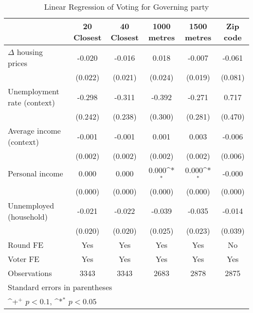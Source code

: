 \begin{table}[htbp]\centering
\def\sym#1{\ifmmode^{#1}\else\(^{#1}\)\fi}
\caption{Linear Regression of Voting for Governing party } \footnotesize \label{lrscale}
\begin{tabular}{l*{5}{c}}
\hline\hline
                    &\multicolumn{1}{c}{20 Closest}&\multicolumn{1}{c}{40 Closest}&\multicolumn{1}{c}{1000 metres}&\multicolumn{1}{c}{1500 metres}&\multicolumn{1}{c}{Zip code}\\
\hline
$\Delta$ housing prices&      -0.020       &      -0.016       &       0.018       &      -0.007       &      -0.061       \\
                    &     (0.022)       &     (0.021)       &     (0.024)       &     (0.019)       &     (0.081)       \\
[1em]
Unemployment rate (context)&      -0.298       &      -0.311       &      -0.392       &      -0.271       &       0.717       \\
                    &     (0.242)       &     (0.238)       &     (0.300)       &     (0.281)       &     (0.470)       \\
[1em]
Average income (context)&      -0.001       &      -0.001       &       0.001       &       0.003       &      -0.006       \\
                    &     (0.002)       &     (0.002)       &     (0.002)       &     (0.002)       &     (0.006)       \\
[1em]
Personal income     &       0.000       &       0.000       &       0.000\sym{*}&       0.000\sym{*}&      -0.000       \\
                    &     (0.000)       &     (0.000)       &     (0.000)       &     (0.000)       &     (0.000)       \\
[1em]
Unnemployed (household)&      -0.021       &      -0.022       &      -0.039       &      -0.035       &      -0.014       \\
                    &     (0.020)       &     (0.020)       &     (0.025)       &     (0.023)       &     (0.039)       \\
[1em]
\hline  Round FE    &         Yes       &         Yes       &         Yes       &         Yes       &          No       \\
[1em]
Voter FE            &         Yes       &         Yes       &         Yes       &         Yes       &         Yes       \\
\hline
Observations        &        3343       &        3343       &        2683       &        2878       &        2875       \\
\hline\hline
\multicolumn{6}{l}{\footnotesize Standard errors in parentheses}\\
\multicolumn{6}{l}{\footnotesize \sym{+} \(p<0.1\), \sym{*} \(p<0.05\)}\\
\end{tabular}
\end{table}
